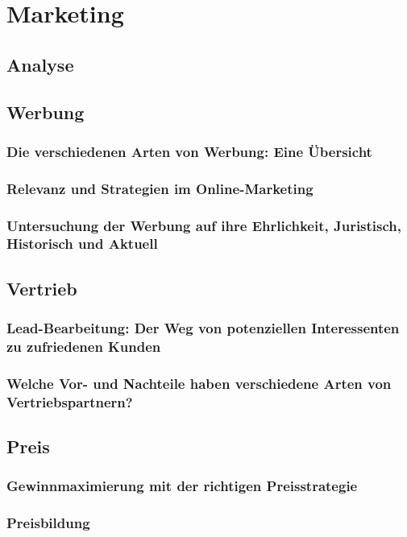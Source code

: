 \chapter{Marketing}
\section{Analyse}
\section{Werbung}
\subsection{Die verschiedenen Arten von Werbung: Eine Übersicht}

\subsection{Relevanz und Strategien im Online-Marketing}

\subsection{Untersuchung der Werbung auf ihre Ehrlichkeit, Juristisch, Historisch und Aktuell}

\section{Vertrieb}
\subsection{Lead-Bearbeitung: Der Weg von potenziellen Interessenten zu zufriedenen Kunden}

\subsection{Welche Vor- und Nachteile haben verschiedene Arten von Vertriebspartnern?}

\section{Preis}
\subsection{Gewinnmaximierung mit der richtigen Preisstrategie}

\subsection{Preisbildung}

